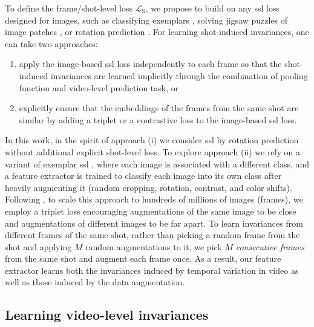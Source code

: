 \documentclass[10pt,twocolumn,letterpaper]{article}
\newcommand{\Ls}{\mathcal L_\text{S}}
\begin{document}
To define the frame/shot-level loss $\Ls$, we propose to build on any \gls{ssl} loss designed for images, such as classifying exemplars \cite{dosovitskiy2014discriminative}, solving jigsaw puzzles of image patches \cite{noroozi2016unsupervised}, or rotation prediction \cite{gidaris2018unsupervised}. For learning shot-induced invariances, one can take two approaches:
\begin{enumerate}[label=(\roman*),itemsep=2pt,parsep=2pt]
    \item apply the image-based \gls{ssl} loss independently to each frame so that the shot-induced invariances are learned implicitly through the combination of pooling function and video-level prediction task, or
    \item explicitly ensure that the embeddings of the frames from the same shot are similar by adding a triplet or a contrastive loss to the image-based \gls{ssl} loss.
\end{enumerate}  
In this work, in the spirit of approach (i) we consider \gls{ssl} by rotation prediction \cite{gidaris2018unsupervised} without additional explicit shot-level loss. To explore approach (ii) we rely on a variant of exemplar \gls{ssl}  \cite{dosovitskiy2014discriminative}, where each image is associated with a different class, and a feature extractor is trained to classify each image into its own class after heavily augmenting it (random cropping, rotation, contrast, and color shifts). Following \cite{doersch2015unsupervised, kolesnikov2019revisiting}, to scale this approach to hundreds of millions of images (frames), we employ a triplet loss \cite{schroff2015facenet} encouraging augmentations of the same image to be close and augmentations of different images to be far apart. To learn invariances from different frames of the same shot, rather than picking a random frame from the shot and applying $M$ random augmentations to it, we pick $M$ \emph{consecutive frames} from the same shot and augment each frame once. As a result, our feature extractor learns both the invariances induced by temporal variation in video as well as those induced by the data augmentation.
\subsection{Learning video-level invariances}\label{sec:video-level-loss}
\end{document}
